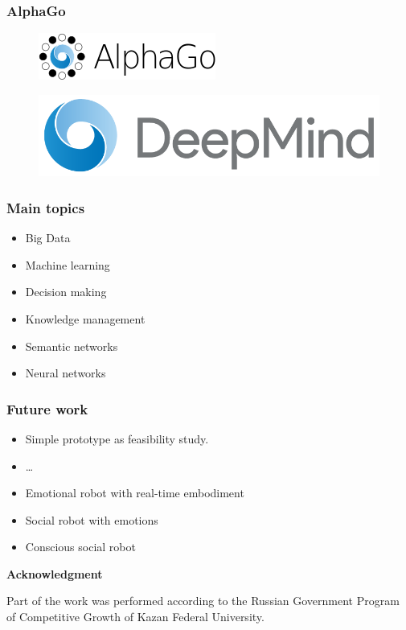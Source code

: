 \documentclass[12pt, aspectratio=169]{beamer}
\begin{document}
\begin{frame}
\frametitle{AlphaGo}
\begin{figure}
  \includegraphics[width=0.45\linewidth]{220px-Alphago.png}
\end{figure}
\begin{figure}
  \includegraphics[width=0.45\linewidth]{DeepMind_logo.png}
\end{figure}
\end{frame}
\begin{frame}
\frametitle{Main topics}
\begin{itemize}
\item Big Data
\item Machine learning
\item Decision making
\item Knowledge management
\item Semantic networks
\item Neural networks
\end{itemize}
\end{frame}


\begin{frame}
  \frametitle{Future work}
  
\begin{itemize}
  \item Simple prototype as feasibility study.
  \item \ldots\
  \item Emotional robot with real-time embodiment
  \item Social robot with emotions
  \item Conscious social robot
\end{itemize}

\textbf{Acknowledgment}

Part of the work was performed according to the Russian Government Program of Competitive Growth of Kazan Federal University.

\end{frame}



\end{document}
